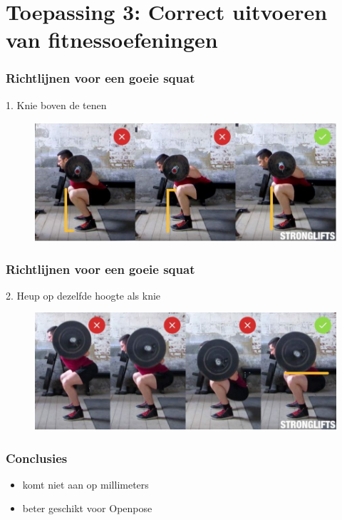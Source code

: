 \documentclass
   [kulak] %
   {kulakbeamer}
\begin{document}
\section{Toepassing 3: Correct uitvoeren van fitnessoefeningen}

\begin{frame}
	\frametitle{Richtlijnen voor een goeie squat}
	1. Knie boven de tenen
	\begin{figure}
		\includegraphics[width= \textwidth]{squat_knie}
	\end{figure}
\end{frame}

\begin{frame}
\frametitle{Richtlijnen voor een goeie squat}
2. Heup op dezelfde hoogte als knie
\begin{figure}
	\includegraphics[width= \textwidth]{squat_heup}
\end{figure}
\end{frame}

\begin{frame}
	\frametitle{Conclusies}
	\begin{itemize}
		\item komt niet aan op millimeters
		\item beter geschikt voor Openpose
	\end{itemize}
\end{frame}
\end{document}
